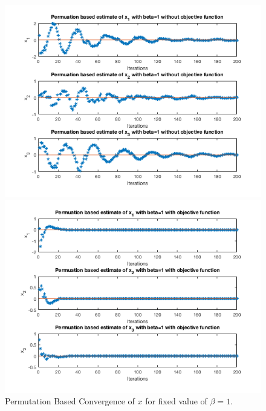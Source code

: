 \documentclass[answers]{exam}
\begin{document}
\begin{itemize}
\begin{framed}
\begin{figure}[H]
    \centering
    \caption{Permutation Based Convergence of $x$ for fixed value of $\beta=1$.}
    \begin{minipage}{.5\textwidth}
        \centering
        \includegraphics[width=1.1\textwidth, height=0.3\textheight]{Problem7_7.png}
    \end{minipage}%
    \begin{minipage}{0.5\textwidth}
        \centering
        \includegraphics[width=1.1\textwidth, height=0.3\textheight]{Problem7_8.png}
    \end{minipage}
    \label{p1}
\end{figure}



\end{framed}
\end{itemize}
\end{document}
